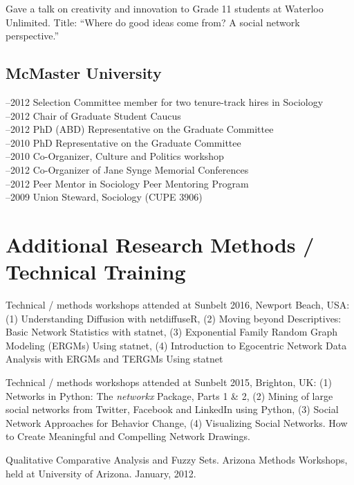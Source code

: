  Gave a talk on creativity and innovation to Grade 11 students
at Waterloo Unlimited. Title: ``Where do good ideas come from? A social
network perspective.''\\




\subsection{McMaster University}\label{mcmaster-university}

--2012 Selection Committee member for two tenure-track hires in
Sociology\\
--2012 Chair of Graduate Student Caucus\\
--2012 PhD (ABD) Representative on the Graduate Committee\\
--2010 PhD Representative on the Graduate Committee\\
--2010 Co-Organizer, Culture and Politics workshop\\
--2012 Co-Organizer of Jane Synge Memorial Conferences\\
--2012 Peer Mentor in Sociology Peer Mentoring Program\\
--2009 Union Steward, Sociology (CUPE 3906)

\section{Additional Research Methods / Technical
Training}\label{additional-research-methods-technical-training}

\ind Technical / methods workshops attended at Sunbelt 2016, Newport
Beach, USA: (1) Understanding Diffusion with netdiffuseR, (2) Moving
beyond Descriptives: Basic Network Statistics with statnet, (3)
Exponential Family Random Graph Modeling (ERGMs) Using statnet, (4)
Introduction to Egocentric Network Data Analysis with ERGMs and TERGMs
Using statnet

\ind Technical / methods workshops attended at Sunbelt 2015, Brighton,
UK: (1) Networks in Python: The \emph{networkx} Package, Parts 1 \& 2,
(2) Mining of large social networks from Twitter, Facebook and LinkedIn
using Python, (3) Social Network Approaches for Behavior Change, (4)
Visualizing Social Networks. How to Create Meaningful and Compelling
Network Drawings.

\ind Qualitative Comparative Analysis and Fuzzy Sets. Arizona Methods
Workshops, held at University of Arizona. January, 2012.

